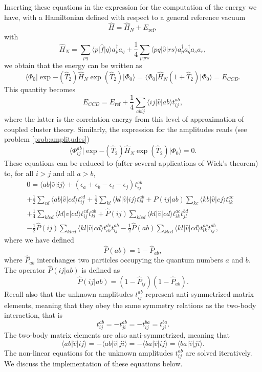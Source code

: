   Inserting these equations in the expression for the computation of
  the energy we have, with a Hamiltonian defined with respect to a
  general reference vacuum
  \[
  \hat{H}=\hat{H}_N+E_{\mathrm{ref}},
  \]
  with
  \[
  \hat{H}_N=\sum_{pq}\langle p \vert \hat{f} \vert q \rangle
  a^{\dagger}_pa_q + \frac{1}{4}\sum_{pqrs}\langle pq \vert \hat{v}
  \vert rs \rangle a^{\dagger}_pa^{\dagger}_qa_sa_r,
  \]
  we obtain that the energy can be written as
  \[
  \langle \Phi_0 \vert
  \exp{-\left(\hat{T}_2\right)}\hat{H}_N\exp{\left(\hat{T}_2\right)}\vert
  \Phi_0\rangle = \langle \Phi_0 \vert \hat{H}_N(1+\hat{T}_2)\vert
  \Phi_0\rangle = E_{CCD}.
  \]
  This quantity becomes
  \[
  E_{CCD}=E_{\mathrm{ref}}+\frac{1}{4}\sum_{abij}\langle ij \vert
  \hat{v} \vert ab \rangle t_{ij}^{ab},
  \]
  where the latter is the correlation energy from this level of
  approximation of coupled cluster  theory.  Similarly, the expression for the
  amplitudes reads (see problem \ref{prob:amplitudes})
  \[
  \langle \Phi_{ij}^{ab} \vert
  \exp{-\left(\hat{T}_2\right)}\hat{H}_N\exp{\left(\hat{T}_2\right)}\vert
  \Phi_0\rangle = 0.
  \]
  These equations can be reduced to (after several applications of
  Wick's theorem) to, for all $i > j$ and all $a > b$,
  \begin{align}
  0 = \langle ab \vert \hat{v} \vert ij \rangle +
  \left(\epsilon_a+\epsilon_b-\epsilon_i-\epsilon_j\right)t_{ij}^{ab}
  & \nonumber \\ +\frac{1}{2}\sum_{cd} \langle ab \vert \hat{v} \vert
  cd \rangle t_{ij}^{cd}+\frac{1}{2}\sum_{kl} \langle kl \vert \hat{v}
  \vert ij \rangle t_{kl}^{ab}+\hat{P}(ij\vert ab)\sum_{kc} \langle kb
  \vert \hat{v} \vert cj \rangle t_{ik}^{ac} & \nonumber
  \\ +\frac{1}{4}\sum_{klcd} \langle kl \vert \hat{v} \vert cd \rangle
  t_{ij}^{cd}t_{kl}^{ab}+\hat{P}(ij)\sum_{klcd} \langle kl \vert
  \hat{v} \vert cd \rangle t_{ik}^{ac}t_{jl}^{bd}& \nonumber
  \\ -\frac{1}{2}\hat{P}(ij)\sum_{klcd} \langle kl \vert \hat{v} \vert
  cd \rangle t_{ik}^{dc}t_{lj}^{ab}-\frac{1}{2}\hat{P}(ab)\sum_{klcd}
  \langle kl \vert \hat{v} \vert cd \rangle t_{lk}^{ac}t_{ij}^{db},&
  \label{eq:ccd}
  \end{align}
  where we have defined
  \[
  \hat{P}\left(ab\right)= 1-\hat{P}_{ab},
  \]
  where $\hat{P}_{ab}$ interchanges two particles occupying the
  quantum numbers $a$ and $b$.  The operator $\hat{P}(ij\vert ab)$ is
  defined as
  \[
  \hat{P}(ij\vert ab) = (1-\hat{P}_{ij})(1-\hat{P}_{ab}).
  \]
  Recall also that the unknown amplitudes $t_{ij}^{ab}$ represent
  anti-symmetrized matrix elements, meaning that they obey the same
  symmetry relations as the two-body interaction, that is
  \[
  t_{ij}^{ab}=-t_{ji}^{ab}=-t_{ij}^{ba}=t_{ji}^{ba}.
  \]
  The two-body matrix elements are also anti-symmetrized, meaning that
  \[
  \langle ab \vert \hat{v} \vert ij \rangle = -\langle ab \vert
  \hat{v} \vert ji \rangle= -\langle ba \vert \hat{v} \vert ij
  \rangle=\langle ba \vert \hat{v} \vert ji \rangle.
  \]
  The non-linear equations for the unknown amplitudes $t_{ij}^{ab}$
  are solved iteratively. We discuss the implementation of these
  equations below.

